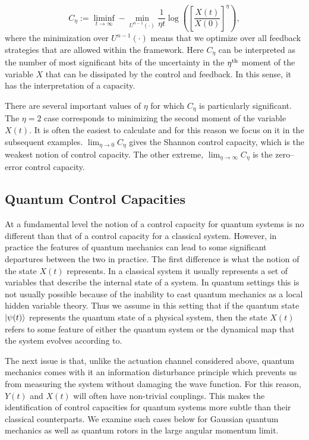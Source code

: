 \documentclass[superscriptaddress,aps,pra,nofootinbib,onecolumn,notitlepage,10pt]{revtex4-1}
\def\ket#1{\mathinner{|{#1}\rangle}}
\begin{document}
\begin{equation}
C_{\eta} :=\liminf_{t\rightarrow \infty} -\min_{U^{n-1}(\cdot)} \frac{1}{\eta t} \log\left(\left[\frac{X(t)}{X(0)}\right]^\eta \right),
\end{equation}
where the minimization over $U^{n-1}(\cdot)$ means that we optimize over all feedback strategies that are allowed within the framework.
Here $C_{\eta}$ can be interpreted as the number of most significant bits of the uncertainty in the $\eta^{\rm th}$ moment of the variable $X$ that can be dissipated by the control and feedback.  In this sense, it has the interpretation of a capacity.

There are several important values of $\eta$ for which $C_{\eta}$ is particularly significant.  The $\eta=2$ case corresponds to minimizing the second moment of the variable $X(t)$.  It is often the easiest to calculate and for this reason we focus on it in the subsequent examples.  $\lim_{\eta \rightarrow 0} C_{\eta}$ gives the Shannon control capacity, which is the weakest notion of control capacity.  The other extreme, $\lim_{\eta \rightarrow \infty} C_{\eta}$ is the zero--error control capacity.

\subsection{Quantum Control Capacities}
At a fundamental level the notion of a control capacity for quantum systems is no different than that of a control capacity for a classical system.  However, in practice the features of quantum mechanics can lead to some significant departures between the two in practice.  The first difference is what the notion of the state $X(t)$ represents.  In a classical system it usually represents a set of variables that describe the internal state of a system.  In quantum settings this is not usually possible because of the inability to cast quantum mechanics as a local hidden variable theory.  Thus we assume in this setting that if the quantum state $\ket{\psi(t)}$ represents the quantum state of a physical system, then the state $X(t)$ refers to some feature of either the quantum system or the dynamical map that the system evolves according to.

The next issue is that, unlike the actuation channel considered above, quantum mechanics comes with it an information disturbance principle which prevents us from measuring the system without damaging the wave function.  For this reason, $Y(t)$ and $X(t)$ will often have non-trivial couplings.  This makes the identification of control capacities for quantum systems more subtle than their classical counterparts.  We examine such cases below for Gaussian quantum mechanics as well as quantum rotors in the large angular momentum limit.
\end{document}
